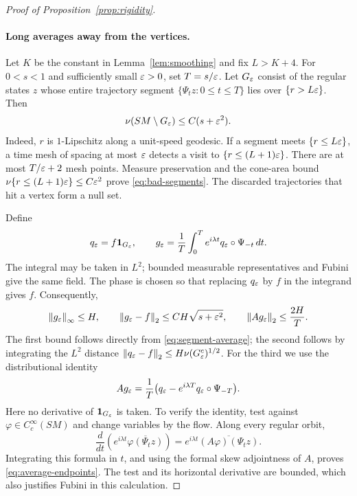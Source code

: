 \begin{proof}[Proof of Proposition~\ref{prop:rigidity}]
\paragraph{Long averages away from the vertices.}
Let $K$ be the constant in Lemma~\ref{lem:smoothing} and fix $L>K+4$.
For $0<s<1$ and sufficiently small $\varepsilon>0$, set $T=s/\varepsilon$.
Let $G_\varepsilon$ consist of the regular states $z$ whose entire trajectory
segment $\{\Psi_tz:0\le t\le T\}$ lies over $\{r>L\varepsilon\}$.
Then
\begin{equation}\label{eq:bad-segments}
 \nu(SM\setminus G_\varepsilon)\le C(s+\varepsilon^2).
\end{equation}
Indeed, $r$ is $1$-Lipschitz along a unit-speed geodesic.  If a segment
meets $\{r\le L\varepsilon\}$, a time mesh of spacing at most $\varepsilon$ detects
a visit to $\{r\le(L+1)\varepsilon\}$.  There are at most $T/\varepsilon+2$ mesh
points.  Measure preservation and the cone-area bound
$\nu\{r\le(L+1)\varepsilon\}\le C\varepsilon^2$ prove
\eqref{eq:bad-segments}.  The discarded trajectories that hit a vertex
form a null set.

Define
\begin{equation}\label{eq:segment-average}
 q_\varepsilon=f\mathbf 1_{G_\varepsilon},\qquad
 g_\varepsilon=\frac1T\int_0^T e^{i\lambda t}
                      q_\varepsilon\circ\Psi_{-t}\,dt.
\end{equation}
The integral may be taken in $L^2$; bounded measurable representatives
and Fubini give the same field.  The phase is chosen so that replacing
$q_\varepsilon$ by $f$ in the integrand gives $f$.  Consequently,
\begin{equation}\label{eq:average-bounds}
 \left\lVert g_\varepsilon\right\rVert_\infty\le H,\qquad
 \left\lVert g_\varepsilon-f\right\rVert_2\le CH\sqrt{s+\varepsilon^2},\qquad
 \left\lVert Ag_\varepsilon\right\rVert_2\le\frac{2H}{T}.
\end{equation}
The first bound follows directly from \eqref{eq:segment-average}; the
second follows by integrating the $L^2$ distance
$\left\lVert q_\varepsilon-f\right\rVert_2\le H\nu(G_\varepsilon^c)^{1/2}$.
For the third we use the distributional identity
\begin{equation}\label{eq:average-endpoints}
 Ag_\varepsilon=\frac1T
       \bigl(q_\varepsilon-e^{i\lambda T}q_\varepsilon\circ\Psi_{-T}\bigr).
\end{equation}
Here no derivative of $\mathbf 1_{G_\varepsilon}$ is taken.  To verify the identity,
test against $\varphi\in C_c^\infty(SM)$ and change variables by the
flow.  Along every regular orbit,
\[
 \frac{d}{dt}\left(e^{i\lambda t}
                  \overline{\varphi(\Psi_tz)}\right)
 =e^{i\lambda t}\overline{(A\varphi)(\Psi_tz)}.
\]
Integrating this formula in $t$, and using the formal skew adjointness
of $A$, proves \eqref{eq:average-endpoints}.  The test and its horizontal
derivative are bounded, which also justifies Fubini in this calculation.


\end{proof}
